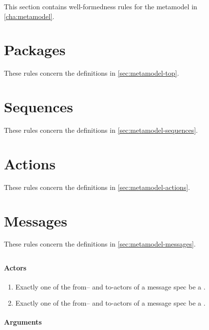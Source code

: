 
This section contains well-formedness rules for the metamodel in
\cref{cha:metamodel}.


\section{Packages}\label{sec:wf-top}

These rules concern the definitions in \cref{sec:metamodel-top}.

\section{Sequences}\label{sec:wf-sequences}

These rules concern the definitions in \cref{sec:metamodel-sequences}.

\section{Actions}\label{sec:wf-actions}

These rules concern the definitions in \cref{sec:metamodel-actions}.

\section{Messages}\label{sec:wf-messages}

These rules concern the definitions in \cref{sec:metamodel-messages}.

\subsection{\mmessagespec}

\paragraph{Actors}

\begin{enumerate}
\item
	Exactly one of the from-- and to-actors of a message spec \rfcmust{} 
	be a \mtarget.
\item
	Exactly one of the from-- and to-actors of a message spec \rfcmust{} 
	be a \mworld.
\end{enumerate}

\paragraph{Arguments}

